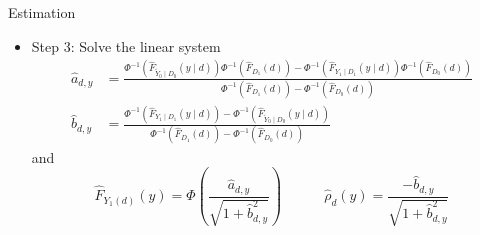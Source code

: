 \documentclass[aspectratio=1610, 9pt]{beamer}
\begin{document}
\begin{frame}{Estimation}
    \begin{itemize}
        \item Step 3: Solve the linear system
        \begin{align*}
            \widehat{a}_{d,y}	&=\frac{\Phi^{-1}\left(\widehat{F}_{\tilde{Y}_{0}\mid D_{0}}(y\mid d)\right)\Phi^{-1}\left(\widehat{F}_{D_{1}}(d)\right)-\Phi^{-1}\left(\widehat{F}_{Y_{1}\mid D_{1}}(y\mid d)\right)\Phi^{-1}\left(\widehat{F}_{D_{0}}(d)\right)}{\Phi^{-1}\left(\widehat{F}_{D_{1}}(d)\right)-\Phi^{-1}\left(\widehat{F}_{D_{0}}(d)\right)}\\
\widehat{b}_{d,y}	&=\frac{\Phi^{-1}\left(\widehat{F}_{Y_{1}\mid D_{1}}(y\mid d)\right)-\Phi^{-1}\left(\widehat{F}_{\tilde{Y}_{0}\mid D_{0}}(y\mid d)\right)}{\Phi^{-1}\left(\widehat{F}_{D_{1}}(d)\right)-\Phi^{-1}\left(\widehat{F}_{D_{0}}(d)\right)}
        \end{align*}
        and 
        $$\widehat{F}_{Y_{1}(d)}(y)	=\Phi\left(\frac{\widehat{a}_{d,y}}{\sqrt{1+\widehat{b}_{d,y}^{2}}}\right)
\quad\qquad \widehat{\rho}_{d}(y)	=\frac{-\widehat{b}_{d,y}}{\sqrt{1+\widehat{b}_{d,y}^{2}}}$$
    \end{itemize}
\end{frame}
\end{document}
